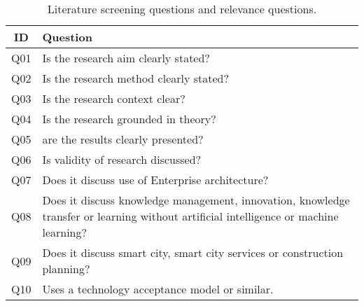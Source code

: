 \begin{table}
    \centering
    \begin{tabular}{|c|p{}|}
        \hline
        ID & Question \\ \hline
        Q01 & Is the research aim clearly stated? \\ \hline
        Q02 & Is the research method clearly stated?\\ \hline
        Q03 & Is the research context clear? \\ \hline
        Q04 & Is the research grounded in theory?\\ \hline
        Q05 & are the results clearly presented?\\ \hline
        Q06 & Is validity of research discussed?\\ \hline
        Q07 & Does it discuss use of Enterprise architecture?\\ \hline
        Q08 & Does it discuss knowledge management, innovation, knowledge transfer or learning without artificial intelligence or machine learning?\\ \hline
        Q09 & Does it discuss smart city, smart city services or construction planning?\\ \hline
        Q10 & Uses a technology acceptance model or similar.\\ \hline
    \end{tabular}
    \caption{Literature screening questions and relevance questions.}
    \label{tab:sceeningQuestions}
\end{table}